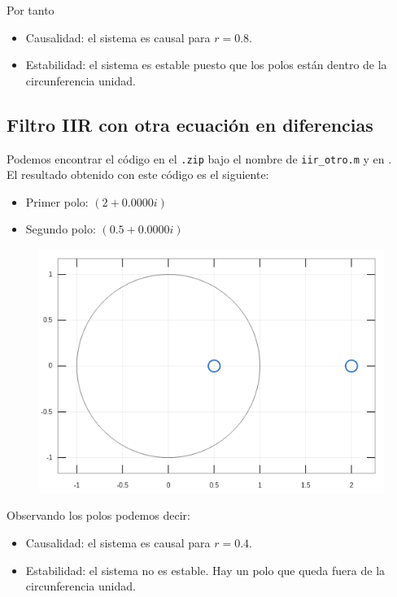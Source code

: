 \documentclass[11pt,a4paper]{article}
\begin{document}
Por tanto

\begin{itemize}
	\item Causalidad: el sistema es causal para $r=0.8$.
	\item Estabilidad: el sistema es estable puesto que los polos están dentro de la circunferencia unidad.
\end{itemize}

\subsection{Filtro IIR con otra ecuación en diferencias}

Podemos encontrar el código en el \texttt{.zip} bajo el nombre de \texttt{iir\_otro.m} y en \color{deepred}\color{black}.\\

El resultado obtenido con este código es el siguiente:

\begin{itemize}
	\item Primer polo: $(2 + 0.0000i)$
   	\item Segundo polo: $(0.5 + 0.0000i)$
\end{itemize}

\begin{figure}[H]
  \centering
  \includegraphics[width=0.7\linewidth]{img/polosg3.png}
\end{figure}

Observando los polos podemos decir:

\begin{itemize}
	\item Causalidad: el sistema es causal para $r=0.4$.
	\item Estabilidad: el sistema no es estable. Hay un polo que queda fuera de la circunferencia unidad.
\end{itemize}
\end{document}
